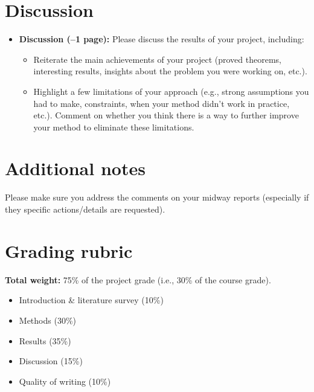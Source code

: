 \documentclass{article}
\begin{document}
\section*{Discussion}

\begin{itemize}[leftmargin=2em]
	


\item \textbf{Discussion (--1 page):}
    Please discuss the results of your project, including:
    \begin{itemize}
        \item Reiterate the main achievements of your project (proved theorems, interesting results, insights about the problem you were working on, etc.).
        \item Highlight a few limitations of your approach (e.g., strong assumptions you had to make, constraints, when your method didn't work in practice, etc.). Comment on whether you think there is a way to further improve your method to eliminate these limitations.
    \end{itemize}
\end{itemize}
    
\section*{Additional notes}

Please make sure you address the comments on your midway reports (especially if they specific actions/details are requested).

\section*{Grading rubric}

\textbf{Total weight:} 75\% of the project grade (i.e., 30\% of the course grade).

\begin{itemize}[leftmargin=2em]
    \item Introduction \& literature survey (10\%)
    \item Methods (30\%)
    \item Results (35\%)
    \item Discussion (15\%)
    \item Quality of writing (10\%)
\end{itemize}

\end{document}
